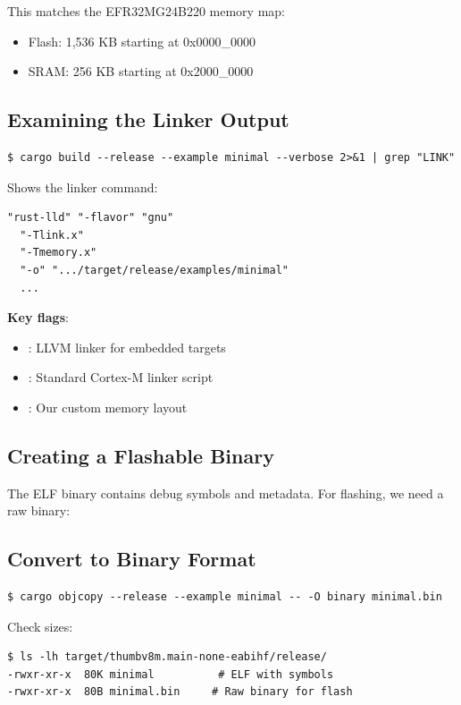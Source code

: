 This matches the EFR32MG24B220 memory map:
\begin{itemize}
    \item Flash: 1,536 KB starting at 0x0000_0000
    \item SRAM: 256 KB starting at 0x2000_0000
\end{itemize}
\subsection{Examining the Linker Output}
\begin{verbatim}
$ cargo build --release --example minimal --verbose 2>&1 | grep "LINK"
\end{verbatim}

Shows the linker command:
\begin{verbatim}
"rust-lld" "-flavor" "gnu"
  "-Tlink.x"
  "-Tmemory.x"
  "-o" ".../target/release/examples/minimal"
  ...
\end{verbatim}

\textbf{Key flags}:
\begin{itemize}
    \item {}: LLVM linker for embedded targets
    \item {}: Standard Cortex-M linker script
    \item {}: Our custom memory layout
\end{itemize}

\subsection{Creating a Flashable Binary}
\label{sec:flashable-binary}

The ELF binary contains debug symbols and metadata. For flashing, we need a raw binary:
\subsection{Convert to Binary Format}
\begin{verbatim}
$ cargo objcopy --release --example minimal -- -O binary minimal.bin
\end{verbatim}

Check sizes:
\begin{verbatim}
$ ls -lh target/thumbv8m.main-none-eabihf/release/
-rwxr-xr-x  80K minimal          # ELF with symbols
-rwxr-xr-x  80B minimal.bin     # Raw binary for flash
\end{verbatim}

